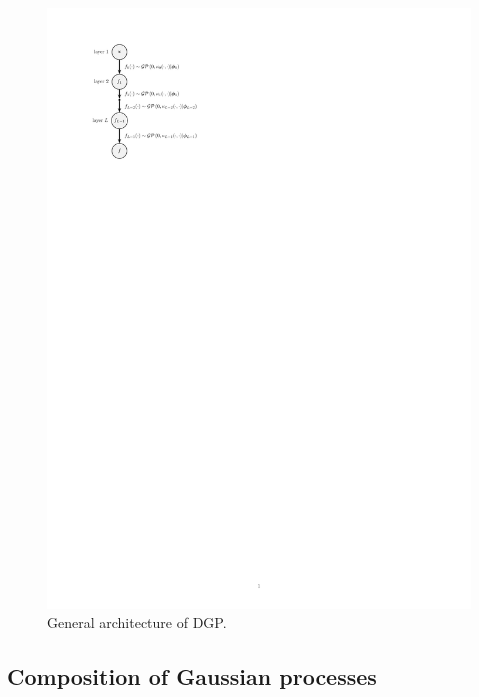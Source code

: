 \documentclass[journal ]{new-aiaa}
\begin{document}
\begin{figure}
	\centering
	\includegraphics[scale=0.8]{Fig6.pdf}
	\caption{General architecture of DGP.}
	\label{Fig-6}
\end{figure}

\subsection{Composition of Gaussian processes}\label{Sec45}
\end{document}
